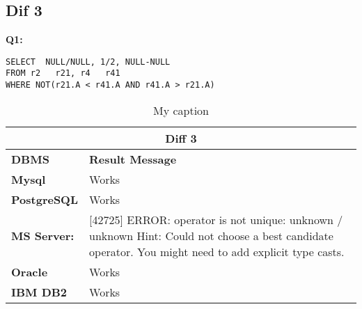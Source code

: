 \subsection{Dif 3}

\textbf{Q1:}
\begin{mdframed}[backgroundcolor=lightgray!20] 
\begin{lstlisting}[style=SQL]
SELECT  NULL/NULL, 1/2, NULL-NULL
FROM r2   r21, r4   r41
WHERE NOT(r21.A < r41.A AND r41.A > r21.A)
\end{lstlisting}
\end{mdframed}

\begin{table}[h]
\centering
\caption{My caption}
\label{my-label}
\begin{tabular}{|p{2cm}|p{12cm}|}
\hline
\multicolumn{2}{|c|}{\textbf{Diff 3}}                                                                                                                                                                                         \\ \hline
\textbf{DBMS}                              & \textbf{Result Message}                                                                                                                                                          \\ \hline
{\color[HTML]{333333} \textbf{Mysql}}      & {\color[HTML]{333333} Works}                                                                                                                                                     \\ \hline
{\color[HTML]{333333} \textbf{PostgreSQL}} & {\color[HTML]{333333} Works}                                                                                                                                                     \\ \hline
{\color[HTML]{333333} \textbf{MS Server:}} & {\color[HTML]{333333} {[}42725{]} ERROR: operator is not unique: unknown / unknown Hint: Could not choose a best candidate operator. You might need to add explicit type casts.} \\ \hline
\textbf{Oracle}                            & Works                                                                                                                                                                            \\ \hline
\textbf{IBM DB2}                           & Works                                                                                                                                                                            \\ \hline
\end{tabular}
\end{table}

